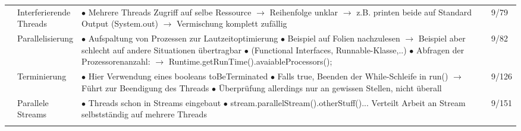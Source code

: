 \documentclass[11pt,a4paper]{article}
\begin{document}
\begin{center}
\begin{longtable}[h]{ | p{2.3cm} | p{2.3cm} | p{12.6cm} | p{1.2cm} | }
	& \makecell[l]{Interferierende \\ Threads} & \makecell[l]{$\bullet$ Mehrere Threads Zugriff auf selbe Ressource \\
	\hspace{0.4cm} $\rightarrow$ Reihenfolge unklar \\
	\hspace{0.4cm} $\rightarrow$ z.B. printen beide auf Standard Output (System.out)
	\hspace{0.4cm} $\rightarrow$ Vermischung komplett zufällig }  & 9/79 \\ \cline{2-4}
	
	& Parallelisierung & \makecell[l]{$\bullet$ Aufspaltung von Prozessen zur Lautzeitoptimierung \\
	$\bullet$ Beispiel auf Folien nachzulesen \\
	\hspace{0.4cm} $\rightarrow$ Beispiel aber schlecht auf andere Situationen übertragbar \\
	$\bullet$ (Functional Interfaces, Runnable-Klasse,..) \\
	$\bullet$ Abfragen der Prozessorenanzahl: \\
	\hspace{0.4cm} $\rightarrow$ Runtime.getRunTime().avaiableProcessors(); }  & 9/82 \\ \cline{2-4}
	
	& Terminierung & \makecell[l]{$\bullet$ Hier Verwendung eines booleans toBeTerminated \\
	$\bullet$ Falls true, Beenden der While-Schleife in run() \\
	\hspace{0.4cm} $\rightarrow$ Führt zur Beendigung des Threads \\
	$\bullet$ Überprüfung allerdings nur an gewissen Stellen, nicht überall }  & 9/126 \\  \cline{2-4}
	
	& \makecell[l]{Parallele \\ Streams} & \makecell[l]{ $\bullet$ Threads schon in Streams eingebaut \\
	$\bullet$ stream.parallelStream().otherStuff()...\\
	\hspace{0.4cm} Verteilt Arbeit an Stream selbstständig auf mehrere Threads } & 9/151 \\
	\hline
	
	
	
	\multicolumn{3}{c}{} \\ 
	\hline 	
	

\end{longtable}
\end{center}
\end{document}
